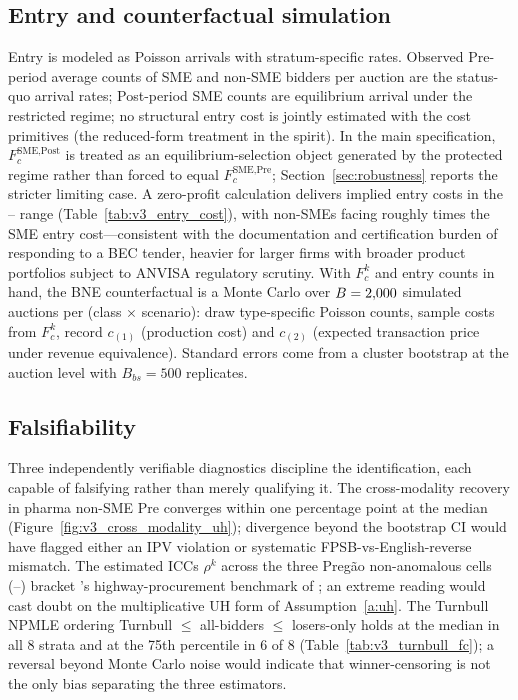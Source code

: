 \subsection{Entry and counterfactual simulation}

Entry is modeled as Poisson arrivals with stratum-specific rates. Observed Pre-period average counts of SME and non-SME bidders per auction are the status-quo arrival rates; Post-period SME counts are equilibrium arrival under the restricted regime; no structural entry cost is jointly estimated with the cost primitives (the reduced-form treatment in the \citet{atheyseira2011} spirit). In the main specification, $F_c^{\text{SME,Post}}$ is treated as an equilibrium-selection object generated by the protected regime rather than forced to equal $F_c^{\text{SME,Pre}}$; Section~\ref{sec:robustness} reports the stricter limiting case. A zero-profit calculation delivers implied entry costs in the \entryCostMin--\entryCostMax{} range (Table~\ref{tab:v3_entry_cost}), with non-SMEs facing roughly \entryCostRatioNp{} times the SME entry cost---consistent with the documentation and certification burden of responding to a BEC tender, heavier for larger firms with broader product portfolios subject to ANVISA regulatory scrutiny. With $F_c^k$ and entry counts in hand, the BNE counterfactual is a Monte Carlo over $B = 2{,}000$ simulated auctions per (class $\times$ scenario): draw type-specific Poisson counts, sample costs from $F_c^k$, record $c_{(1)}$ (production cost) and $c_{(2)}$ (expected transaction price under revenue equivalence). Standard errors come from a cluster bootstrap at the auction level with $B_{bs} = 500$ replicates.

\subsection{Falsifiability}\label{sec:falsifiability}

Three independently verifiable diagnostics discipline the identification, each capable of falsifying rather than merely qualifying it. The cross-modality recovery in pharma non-SME Pre converges within one percentage point at the median (Figure~\ref{fig:v3_cross_modality_uh}); divergence beyond the bootstrap CI would have flagged either an IPV violation or systematic FPSB-vs-English-reverse mismatch. The estimated ICCs $\rho^k$ across the three Preg\~ao non-anomalous cells (\iccNpSme--\iccPharmaNonSme) bracket \citet{krasnokutskaya2011}'s highway-procurement benchmark of \krasICC; an extreme reading would cast doubt on the multiplicative UH form of Assumption~\ref{a:uh}. The Turnbull NPMLE ordering Turnbull $\le$ all-bidders $\le$ losers-only holds at the median in all 8 strata and at the 75th percentile in 6 of 8 (Table~\ref{tab:v3_turnbull_fc}); a reversal beyond Monte Carlo noise would indicate that winner-censoring is not the only bias separating the three estimators.

